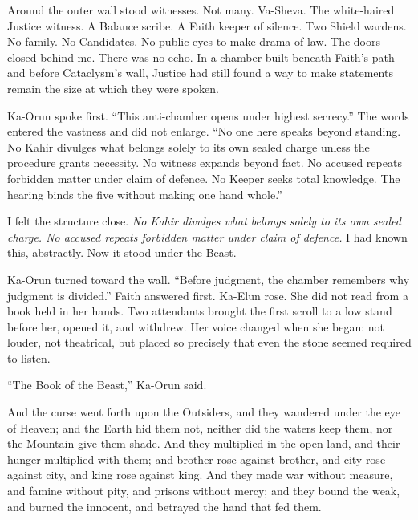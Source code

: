 Around the outer wall stood witnesses. Not many. Va-Sheva. The white-haired Justice witness. A Balance scribe. A Faith keeper of silence. Two Shield wardens. No family. No Candidates. No public eyes to make drama of law. The doors closed behind me. There was no echo. In a chamber built beneath Faith's path and before Cataclysm's wall, Justice had still found a way to make statements remain the size at which they were spoken.\par

Ka-Orun spoke first. ``This anti-chamber opens under highest secrecy.'' The words entered the vastness and did not enlarge. ``No one here speaks beyond standing. No Kahir divulges what belongs solely to its own sealed charge unless the procedure grants necessity. No witness expands beyond fact. No accused repeats forbidden matter under claim of defence. No Keeper seeks total knowledge. The hearing binds the five without making one hand whole.''\par

I felt the structure close. \emph{No Kahir divulges what belongs solely to its own sealed charge. No accused repeats forbidden matter under claim of defence.} I had known this, abstractly. Now it stood under the Beast.\par

Ka-Orun turned toward the wall. ``Before judgment, the chamber remembers why judgment is divided.'' Faith answered first. Ka-Elun rose. She did not read from a book held in her hands. Two attendants brought the first scroll to a low stand before her, opened it, and withdrew. Her voice changed when she began: not louder, not theatrical, but placed so precisely that even the stone seemed required to listen.\par

``The Book of the Beast,'' Ka-Orun said.\par

\begin{scripture}
And the curse went forth upon the Outsiders, and they wandered under the eye of Heaven; and the Earth hid them not, neither did the waters keep them, nor the Mountain give them shade.
And they multiplied in the open land, and their hunger multiplied with them; and brother rose against brother, and city rose against city, and king rose against king.
And they made war without measure, and famine without pity, and prisons without mercy; and they bound the weak, and burned the innocent, and betrayed the hand that fed them.
\end{scripture}

